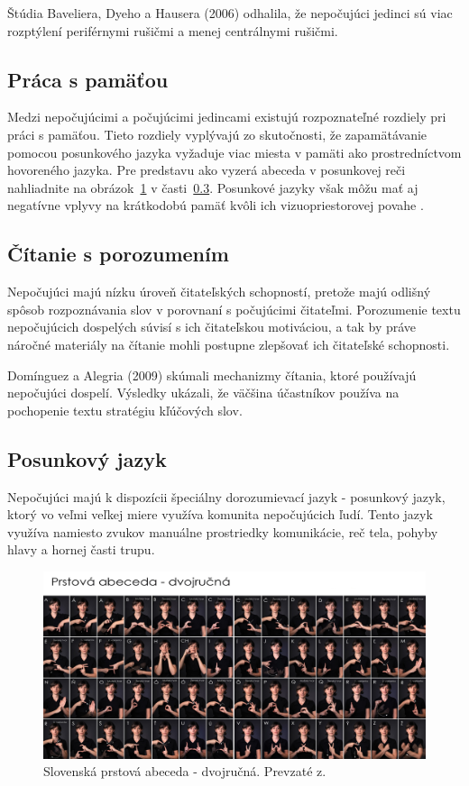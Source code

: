 \documentclass[10pt,oneside,slovak,a4paper]{article}
\begin{document}
Štúdia Baveliera, Dyeho a Hausera (2006) odhalila, že nepočujúci jedinci sú viac rozptýlení periférnymi rušičmi a menej centrálnymi rušičmi. \cite{bavelier2006deaf} 

\subsection{Práca s pamäťou} \label{rozdiely:pamat}
Medzi nepočujúcimi a počujúcimi jedincami existujú rozpoznateľné rozdiely pri práci s pamäťou. Tieto rozdiely vyplývajú zo skutočnosti, že zapamätávanie pomocou posunkového jazyka vyžaduje viac miesta v pamäti ako prostredníctvom hovoreného jazyka. Pre predstavu ako vyzerá abeceda v posunkovej reči nahliadnite na obrázok~\ref{slovenskaposunkovarec} v časti~\ref{rozdiely:posunkovyjazyk}. Posunkové jazyky však môžu mať aj negatívne vplyvy na krátkodobú pamäť kvôli ich vizuopriestorovej povahe
\cite{pappas2018learning}.

\subsection{Čítanie s porozumením} \label{rozdiely:citanie}
Nepočujúci majú nízku úroveň čitateľských schopností, pretože majú odlišný spôsob rozpoznávania slov v porovnaní s počujúcimi čitateľmi. Porozumenie textu nepočujúcich dospelých súvisí s ich čitateľskou motiváciou, a tak by práve náročné materiály na čítanie mohli postupne zlepšovať ich čitateľské schopnosti\cite{pappas2018learning}.

Domínguez a Alegria (2009) skúmali mechanizmy čítania, ktoré používajú nepočujúci dospelí. Výsledky ukázali, že väčšina účastníkov používa na pochopenie textu stratégiu kľúčových slov\cite{dominguez2010reading}. 

\subsection{Posunkový jazyk}
\label{rozdiely:posunkovyjazyk}
Nepočujúci majú k dispozícii špeciálny dorozumievací jazyk - posunkový jazyk, ktorý vo veľmi veľkej miere využíva komunita nepočujúcich ľudí. Tento jazyk využíva namiesto zvukov manuálne prostriedky komunikácie, reč tela, pohyby hlavy a hornej časti trupu.
\begin{figure}[H]
   \includegraphics[scale=0.13]{dvojrucnaabeceda.jpg}
\centering
\caption{Slovenská prstová abeceda - dvojručná. Prevzaté z\cite{mytyafakty}.}

\label{slovenskaposunkovarec}
\end{figure}
\end{document}
